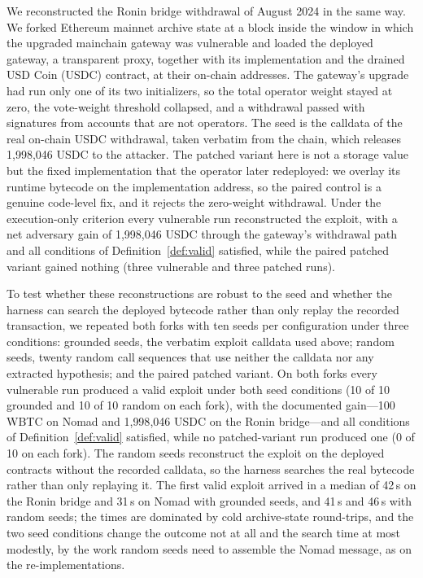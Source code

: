 \documentclass[a4paper]{cas-sc}
\begin{document}
We reconstructed the Ronin bridge withdrawal of August 2024 in the same way. We forked Ethereum mainnet archive state at a block inside the window in which the upgraded mainchain gateway was vulnerable and loaded the deployed gateway, a transparent proxy, together with its implementation and the drained USD Coin (USDC) contract, at their on-chain addresses. The gateway's upgrade had run only one of its two initializers, so the total operator weight stayed at zero, the vote-weight threshold collapsed, and a withdrawal passed with signatures from accounts that are not operators. The seed is the calldata of the real on-chain USDC withdrawal, taken verbatim from the chain, which releases 1{,}998{,}046 USDC to the attacker. The patched variant here is not a storage value but the fixed implementation that the operator later redeployed: we overlay its runtime bytecode on the implementation address, so the paired control is a genuine code-level fix, and it rejects the zero-weight withdrawal. Under the execution-only criterion every vulnerable run reconstructed the exploit, with a net adversary gain of 1{,}998{,}046 USDC through the gateway's withdrawal path and all conditions of Definition~\ref{def:valid} satisfied, while the paired patched variant gained nothing (three vulnerable and three patched runs).

To test whether these reconstructions are robust to the seed and whether the harness can search the deployed bytecode rather than only replay the recorded transaction, we repeated both forks with ten seeds per configuration under three conditions: grounded seeds, the verbatim exploit calldata used above; random seeds, twenty random call sequences that use neither the calldata nor any extracted hypothesis; and the paired patched variant. On both forks every vulnerable run produced a valid exploit under both seed conditions (10 of 10 grounded and 10 of 10 random on each fork), with the documented gain---100 WBTC on Nomad and 1{,}998{,}046 USDC on the Ronin bridge---and all conditions of Definition~\ref{def:valid} satisfied, while no patched-variant run produced one (0 of 10 on each fork). The random seeds reconstruct the exploit on the deployed contracts without the recorded calldata, so the harness searches the real bytecode rather than only replaying it. The first valid exploit arrived in a median of 42\,s on the Ronin bridge and 31\,s on Nomad with grounded seeds, and 41\,s and 46\,s with random seeds; the times are dominated by cold archive-state round-trips, and the two seed conditions change the outcome not at all and the search time at most modestly, by the work random seeds need to assemble the Nomad message, as on the re-implementations.
\end{document}
